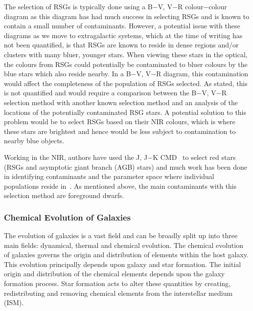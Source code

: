 \documentclass[a4paper,12pt]{article}
\begin{document}
The selection of RSGs is typically done using a B$-$V, V$-$R colour$-$colour diagram as this diagram has had much success in selecting RSGs and is known to contain a small number of contaminants. 
However, a potential issue with these diagrams as we move to extragalactic systems, which at the time of writing has not been quantified, is that RSGs are known to reside in dense regions and/or clusters with many bluer, younger stars. 
When viewing these stars in the optical, the colours from RSGs could potentially be contaminated to bluer colours by the blue stars which also reside nearby. 
In a B$-$V, V$-$R diagram, this contamination would affect the completeness of the population of RSGs selected. 
As stated, this is not quantified and would require a comparison between the B$-$V, V$-$R selection method with another known selection method and an analysis of the locations of the potentially contaminated RSG stars.
A potential solution to this problem would be to select RSGs based on their NIR colours, which is where these stars are brightest and hence would be less subject to contamination to nearby blue objects. 

Working in the NIR, authors have used the J, J$-$K CMD~\citep{Nikolaev00, Cioni06,Neugent12} to select red stars (RSGs and asymptotic giant branch (AGB) stars) and much work has been done in identifying contaminants and the parameter space where individual populations reside in~\citep{Cioni06}.
As mentioned above, the main contaminants with this selection method are foreground dwarfs.


\subsubsection{Chemical Evolution of Galaxies}\label{evolution}

The evolution of galaxies is a vast field and can be broadly split up into three main fields: dynamical, thermal and chemical evolution. 
The chemical evolution of galaxies governs the origin and distribution of elements within the host galaxy. 
This evolution principally depends upon galaxy and star formation. 
The initial origin and distribution of the chemical elements depends upon the galaxy formation process.
Star formation acts to alter these quantities by creating, redistributing and removing chemical elements from the interstellar medium (ISM). 
\end{document}
